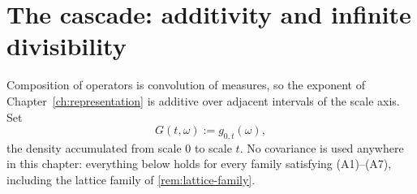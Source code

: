 %
%
%
%

\chapter{The cascade: additivity and infinite divisibility}
\label{ch:cascade}

Composition of operators is convolution of measures, so the exponent of
Chapter~\ref{ch:representation} is additive over adjacent intervals of the scale axis. Set
\[
  G(t,\omega) := g_{0,t}(\omega),
\]
the density accumulated from scale $0$ to scale $t$. No covariance is used anywhere in this
chapter: everything below holds for every family satisfying (A1)--(A7), including the lattice
family of \ref{rem:lattice-family}.

